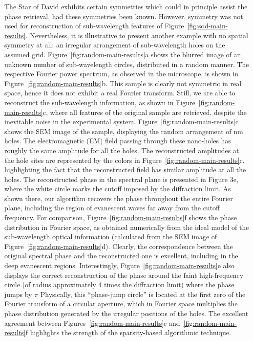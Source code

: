 The Star of David exhibits certain symmetries which could in principle
assist the phase retrieval, had these symmetries been known. However,
symmetry was not used for reconstruction of sub-wavelength features of
Figure~\ref{fig:sod-main-results}. Nevertheless, it is illustrative to
present another example with no spatial symmetry at all: an irregular
arrangement of sub-wavelength holes on the assumed
grid. Figure~\ref{fig:random-main-results}a shows the blurred image of
an unknown number of sub-wavelength circles, distributed in a random
manner. The respective Fourier power spectrum, as observed in the
microscope, is shown in Figure~\ref{fig:random-main-results}b. This
sample is clearly not symmetric in real space, hence it does not
exhibit a real Fourier transform. Still, we are able to reconstruct
the sub-wavelength information, as shown in
Figure~\ref{fig:random-main-results}c, where all features of the
original sample are retrieved, despite the inevitable noise in the
experimental system. Figure~\ref{fig:random-main-results}c shows the
SEM image of the sample, displaying the random arrangement of \unit[100]{nm}
holes. The electromagnetic (EM) field passing through these nano-holes
has roughly the
same amplitude for all the holes. The reconstructed amplitudes at the
hole sites are represented by the colors in
Figure~\ref{fig:random-main-results}c, highlighting the fact that the
reconstructed field has similar amplitude at all the holes. The
reconstructed phase in the spectral plane is presented in Figure 3e,
where the white circle marks the cutoff imposed by the diffraction
limit. As shown there, our algorithm recovers the phase throughout the
entire Fourier plane, including the region of evanescent waves far
away from the cutoff frequency. For comparison,
Figure~\ref{fig:random-main-results}f shows the phase distribution in
Fourier space, as obtained numerically from the ideal model of the
sub-wavelength optical information (calculated from the SEM image of
Figure~\ref{fig:random-main-results}d). Clearly, the correspondence
between the original spectral phase and the reconstructed one is
excellent, including in the deep evanescent regions. Interestingly,
Figure~\ref{fig:random-main-results}e also displays the correct
reconstruction of the phase around the faint high-frequency circle (of
radius approximately 4 times the diffraction limit) where the phase
jumps by $\pi$ Physically, this ``phase-jump circle'' is located at the
first zero of the Fourier transform of a circular aperture, which in
Fourier space multiplies the phase distribution generated by the
irregular positions of the holes. The excellent agreement between
Figures~\ref{fig:random-main-results}e
and~\ref{fig:random-main-results}f highlights the strength of the
sparsity-based algorithmic technique.

